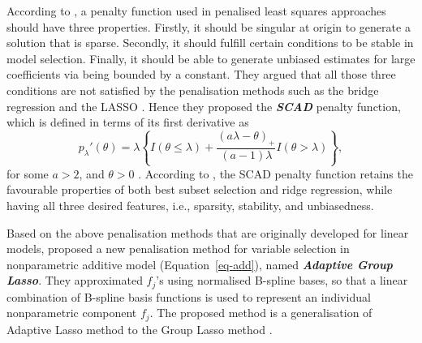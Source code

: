 \documentclass[11pt,a4paper,]{article}
\begin{document}
According to \textcite{Fan2001}, a penalty function used in penalised
least squares approaches should have three properties. Firstly, it
should be singular at origin to generate a solution that is sparse.
Secondly, it should fulfill certain conditions to be stable in model
selection. Finally, it should be able to generate unbiased estimates for
large coefficients via being bounded by a constant. They argued that all
those three conditions are not satisfied by the penalisation methods
such as the bridge regression \autocite{Frank1993} and the LASSO
\autocite{Tibshirani1996}. Hence they proposed the \textbf{\emph{SCAD}}
penalty function, which is defined in terms of its first derivative as
\[
 p_{\lambda}'(\theta) = \lambda\left\{I(\theta\le\lambda) + \frac{(a\lambda - \theta)_{+}}{(a - 1)\lambda}I(\theta > \lambda)\right\},
\] for some \(a > 2\), and \(\theta > 0\) \autocite{Fan2001}. According
to \textcite{Fan2001}, the SCAD penalty function retains the favourable
properties of both best subset selection and ridge regression, while
having all three desired features, i.e., sparsity, stability, and
unbiasedness.

Based on the above penalisation methods that are originally developed
for linear models, \textcite{Huang2010} proposed a new penalisation
method for variable selection in nonparametric additive model
(Equation~\ref{eq-add}), named \textbf{\emph{Adaptive Group Lasso}}.
They approximated \(f_{j}\)'s using normalised B-spline bases, so that a
linear combination of B-spline basis functions is used to represent an
individual nonparametric component \(f_{j}\). The proposed method is a
generalisation of Adaptive Lasso method \autocite{Zou2006} to the Group
Lasso method \autocite{Yuan2006}.
\end{document}
